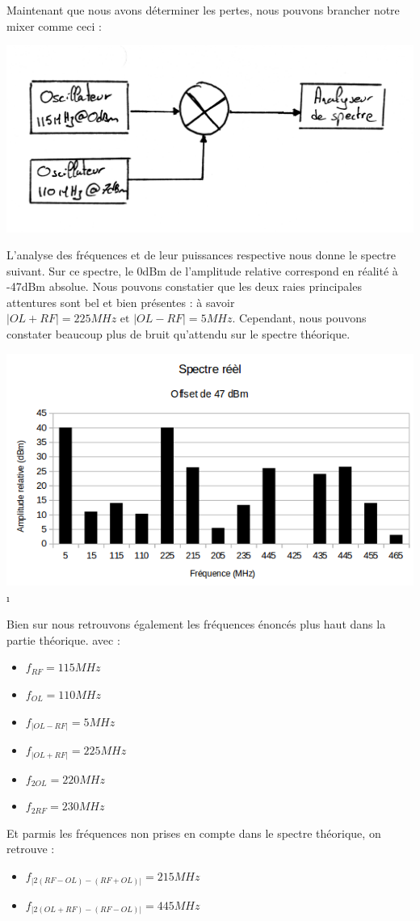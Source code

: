 \documentclass[a4paper,12pt]{report}            %
\begin{document}
    Maintenant que nous avons déterminer les pertes, nous pouvons brancher notre mixer
comme ceci :
\begin{center}\includegraphics[scale = 0.2]{pic/cablage.png}\\ \end{center}


    L'analyse des fréquences et de leur puissances respective nous donne le spectre suivant.
Sur ce spectre, le 0dBm de l'amplitude relative correspond en réalité à -47dBm absolue. Nous 
pouvons constatier que les deux raies principales attentures sont bel et bien présentes :
à savoir $|OL+RF| = 225 MHz \mbox{ et } |OL-RF| = 5 MHz$. Cependant, nous pouvons constater 
beaucoup plus de bruit qu'attendu sur le spectre théorique.
\begin{center}\includegraphics[scale = 0.7]{pic/spectre_reel.png}\i\ \end{center}


    Bien sur nous retrouvons également les fréquences énoncés plus haut dans la partie théorique.
avec :
\begin{itemize}
    \item $f_{RF} = 115 MHz$
    \item $f_{OL} = 110 MHz$ 
    \item $f_{|OL-RF|} = 5 MHz$
    \item $f_{|OL+RF|} = 225 MHz$
    \item $f_{2OL} = 220 MHz$
    \item $f_{2RF} = 230 MHz$
\end{itemize}
Et parmis les fréquences non prises en compte dans le spectre théorique, on retrouve :
\begin{itemize}
    \item $f_{|2(RF-OL)-(RF+OL)|} = 215 MHz$
    \item $f_{|2(OL+RF)-(RF-OL)|} = 445 MHz$ 
\end{itemize}
\end{document}
